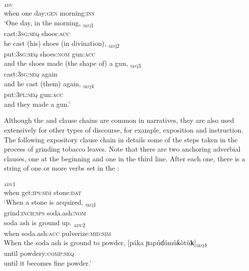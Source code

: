 \ea\label{ex:syn:68}
  \ea
  \textsc{\textsubscript{adv}} \\
when    one    day:\textsc{gen}   morning:\textsc{ins}     \\  
  \glt ‘One day, in the morning,  
  \medskip
  \ex
    \textsc{\textsubscript{seq1}} \\
cast:\textsc{3sg:seq}   shoes:\textsc{acc}    \\
  \glt he cast (his) shoes (in divination),
  \medskip
  \ex  
  \textsc{\textsubscript{seq2}} \\
put:\textsc{3sg:seq}   shoes\textsc{:nom}     gun:\textsc{acc}    \\
  \glt and the shoes made (the shape of) a gun,
  \medskip
  \ex
  \textsc{\textsubscript{seq3}} \\
cast:\textsc{3sg:seq}   again    \\
  \glt and he cast (them) again,
  \medskip
  \ex
  \textsc{\textsubscript{seq4}} \\
put:\textsc{3pl}:\textsc{seq}     gun:\textsc{acc}    \\
  \glt and they made a gun.’
  \z  
\z

Although the  and clause chains are common in narratives, they are also used extensively for other types of discourse, for example, exposition and instruction. The following expository clause chain in  details some of the steps taken in the process of grinding tobacco leaves. Note that there are two anchoring adverbial clauses, one at the beginning and one in the third line. After each one, there is a string of one or more verbs set in the :



\ea\label{ex:syn:69}
  \ea
  \textsc{\textsubscript{adv1}} \\
when   get:\textsc{ips:sim}   stone:\textsc{dat}    \\
  \glt ‘When a stone is acquired, 
  \medskip
  \ex
  \textsc{\textsubscript{seq1}} \\
grind:\textsc{inch:sps}   soda.ash:\textsc{nom}    \\
  \glt soda ash is ground up.
  \medskip
  \ex
  \textsc{\textsubscript{adv2}} \\
when   soda.ash:\textsc{acc}   pulverize:\textsc{mid:sim}    \\
  \glt When the soda ash is ground to powder,
  \medskip
  \ex
  \gll [páka ɲapúɗúmùƙòtù\textbf{k\ᵒ}{]}\textsc{\textsubscript{seq4}} \\
until powdery:\textsc{comp:seq}    \\
  \glt until it becomes fine powder.’
  \z  
\z 

